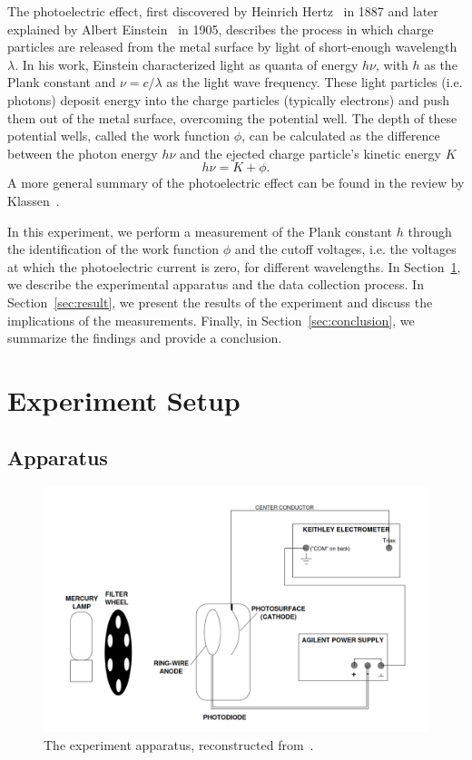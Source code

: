 \documentclass[aps,twocolumn,secnumarabic,balancelastpage,amsmath,amssymb,nofootinbib,floatfix]{revtex4-1}
\begin{document}
The photoelectric effect, first discovered by Heinrich Hertz~\citep{1Hertz887} in 1887 and later explained by Albert Einstein~\cite{Einstein1905} in 1905, describes the process in which charge particles are released from the metal surface by light of short-enough wavelength $\lambda$. In his work, Einstein characterized light as quanta of energy $h \nu$, with $h$ as the Plank constant and $\nu = c/\lambda$ as the light wave frequency. These light particles (i.e. photons) deposit energy into the charge particles (typically electrons) and push them out of the metal surface, overcoming the potential well. The depth of these potential wells, called the work function $\phi$, can be calculated as the difference between the photon energy $h \nu$ and the ejected charge particle's kinetic energy $K$
\begin{equation}
    \label{eqn:work_function}
    h \nu = K + \phi.
\end{equation}
A more general summary of the photoelectric effect can be found in the review by Klassen~\citep{Klassen2011}.

In this experiment, we perform a measurement of the Plank constant $h$ through the identification of the work function $\phi$ and the cutoff voltages, i.e. the voltages at which the photoelectric current is zero, for different wavelengths. In Section~\ref{sec:experiment}, we describe the experimental apparatus and the data collection process. In Section~\ref{sec:result}, we present the results of the experiment and discuss the implications of the measurements. Finally, in Section~\ref{sec:conclusion}, we summarize the findings and provide a conclusion.


\section{Experiment Setup}
\label{sec:experiment}

\subsection{Apparatus}
\label{sec:apparatus}

\begin{figure}
    \centering
    \includegraphics[width=0.49 \textwidth]{Figures/apparatus.png}
    \caption{The experiment apparatus, reconstructed from~\citep{MITPhotoelectricEffect}.}
    \label{fig:apparatus}
\end{figure}
\end{document}
